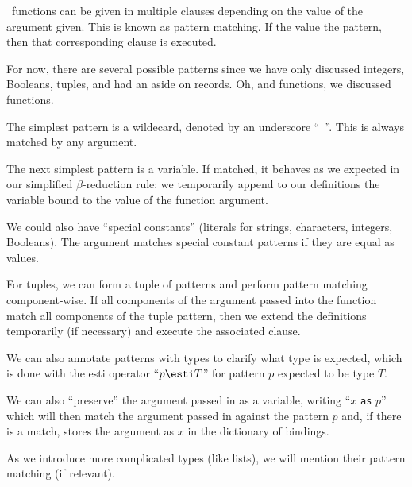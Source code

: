 \begin{node}\label{sml-000M}%
\SML\ functions can be given in multiple clauses depending on the value
of the argument given. This is known as pattern matching. If the value
 the pattern, then that corresponding clause is executed.

For now, there are several possible patterns since we have only
discussed integers, Booleans, tuples, and had an aside on records. Oh,
and functions, we discussed functions.

The simplest pattern is a wildecard, denoted by an underscore ``\verb|_|''.
This is always matched by any argument.

The next simplest pattern is a variable. If matched, it behaves as we
expected in our simplified $\beta$-reduction rule: we temporarily append
to our definitions the variable bound to the value of the function argument.

We could also have ``special constants'' (literals for strings,
characters, integers, Booleans). The argument matches special constant
patterns if they are equal as values.

For tuples, we can form a tuple of patterns and perform pattern matching
component-wise. If all components of the argument passed into the
function match all components of the tuple pattern, then we extend the
definitions temporarily (if necessary) and execute the associated
clause.

We can also annotate patterns with types to clarify what type is
expected, which is done with the esti operator ``$p\esti T$'' for
pattern $p$ expected to be type $T$.

We can also ``preserve'' the argument passed in as a variable, writing
``$x$ \texttt{as} $p$'' which will then match the argument passed in
against the pattern $p$ and, if there is a match, stores the argument as
$x$ in the dictionary of bindings.

As we introduce more complicated types (like lists), we will mention
their pattern matching (if relevant).
\end{node}
